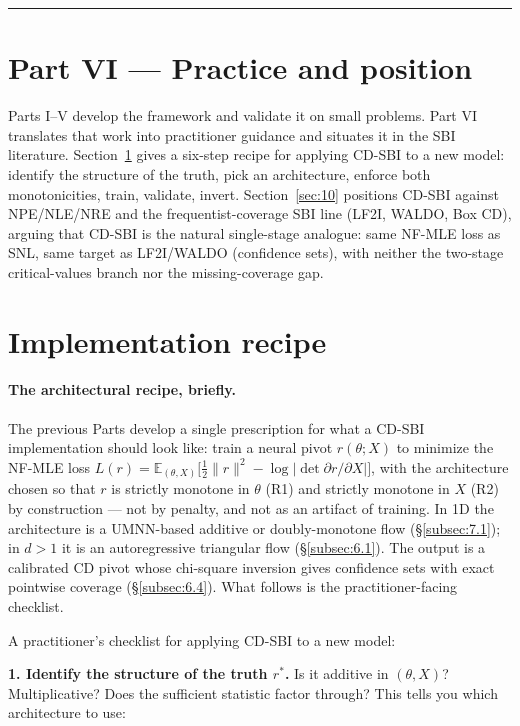 \documentclass[11pt]{article}
\begin{document}
\medskip\hrule\medskip

\section*{Part VI — Practice and position}

Parts I--V develop the framework and validate it on small problems.
Part VI translates that work into practitioner guidance and situates
it in the SBI literature. Section~\ref{sec:9} gives a six-step recipe
for applying CD-SBI to a new model: identify the structure of the
truth, pick an architecture, enforce both monotonicities, train,
validate, invert. Section~\ref{sec:10} positions CD-SBI against
NPE/NLE/NRE and the frequentist-coverage SBI line (LF2I, WALDO, Box CD),
arguing that CD-SBI is the natural single-stage analogue: same NF-MLE
loss as SNL, same target as LF2I/WALDO (confidence sets), with neither
the two-stage critical-values branch nor the missing-coverage gap.

\section{Implementation recipe}\label{sec:9}

\paragraph{The architectural recipe, briefly.}
The previous Parts develop a single prescription for what a CD-SBI
implementation should look like: train a neural pivot \(r(\theta; X)\)
to minimize the NF-MLE loss
\(L(r) = \mathbb{E}_{(\theta, X)}\bigl[\tfrac{1}{2}\|r\|^2 - \log|\det \partial r / \partial X|\bigr]\),
with the architecture chosen so that \(r\) is strictly monotone in
\(\theta\) (R1) and strictly monotone in \(X\) (R2) by construction ---
not by penalty, and not as an artifact of training. In 1D the
architecture is a UMNN-based additive or doubly-monotone flow
(§\ref{subsec:7.1}); in \(d > 1\) it is an autoregressive triangular
flow (§\ref{subsec:6.1}). The output is a calibrated CD pivot whose
chi-square inversion gives confidence sets with exact pointwise
coverage (§\ref{subsec:6.4}). What follows is the practitioner-facing
checklist.

A practitioner's checklist for applying CD-SBI to a new model:

\textbf{1. Identify the structure of the truth \(r^*\).} Is it additive
in \((\theta, X)\)? Multiplicative? Does the sufficient statistic factor
through? This tells you which architecture to use:
\end{document}
